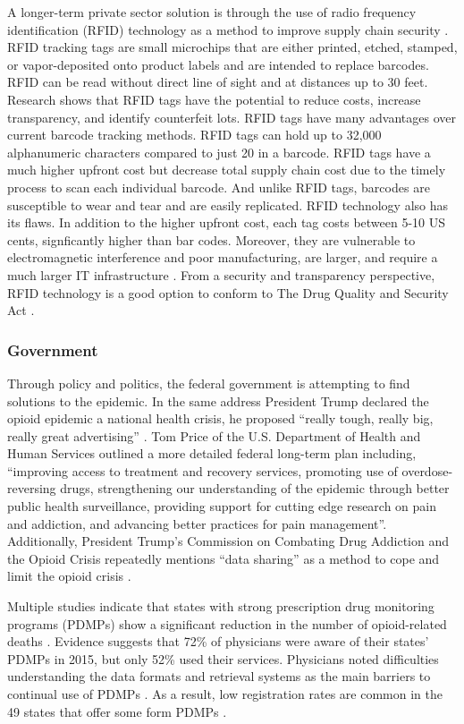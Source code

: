 \documentclass[sigconf]{acmart}
\begin{document}
A longer-term private sector solution is through the use of radio frequency identification (RFID) technology as a method to improve supply chain security \cite{Taylor01} \cite{Wyld01}. RFID tracking tags are small microchips that are either printed, etched, stamped, or vapor-deposited onto product labels and are intended to replace barcodes. RFID can be read without direct line of sight and at distances up to 30 feet. Research shows that RFID tags have the potential to reduce costs, increase transparency, and identify counterfeit lots. RFID tags have many advantages over current barcode tracking methods. RFID tags can hold up to 32,000 alphanumeric characters compared to just 20 in a barcode. RFID tags have a much higher upfront cost but decrease total supply chain cost due to the timely process to scan each individual barcode. And unlike RFID tags, barcodes are susceptible to wear and tear and are easily replicated. RFID technology also has its flaws. In addition to the higher upfront cost, each tag costs between 5-10 US cents, signficantly higher than bar codes. Moreover, they are vulnerable to electromagnetic interference and poor manufacturing, are larger, and require a much larger IT infrastructure \cite{Taylor01} \cite{opsis9}. From a security and transparency perspective, RFID technology is a good option to conform to The Drug Quality and Security Act \cite{DQASA}.

\subsubsection{Government}
Through policy and politics, the federal government is attempting to find solutions to the epidemic. In the same address President Trump declared the opioid epidemic a national health crisis, he proposed ``really tough, really big, really great advertising'' \cite{opsis6}. Tom Price of the U.S. Department of Health and Human Services outlined a more detailed federal long-term plan including, ``improving access to treatment and recovery services, promoting use of overdose-reversing drugs, strengthening our understanding of the epidemic through better public health surveillance, providing support for cutting edge research on pain and addiction, and advancing better practices for pain management''\cite{opsis7}. Additionally, President Trump's Commission on Combating Drug Addiction and the Opioid Crisis repeatedly mentions ``data sharing'' as a method to cope and limit the opioid crisis \cite{opsis3}.

Multiple studies indicate that states with strong prescription drug monitoring programs (PDMPs) show a significant reduction in the number of opioid-related deaths \cite{pardo01} \cite{patrick01}. Evidence suggests that 72\% of physicians were aware of their states' PDMPs in 2015, but only 52\% used their services. Physicians noted difficulties understanding the data formats and retrieval systems as the main barriers to continual use of PDMPs \cite{Rutkow01}. As a result, low registration rates are common in the 49 states that offer some form PDMPs \cite{Hawk01}.
\end{document}
